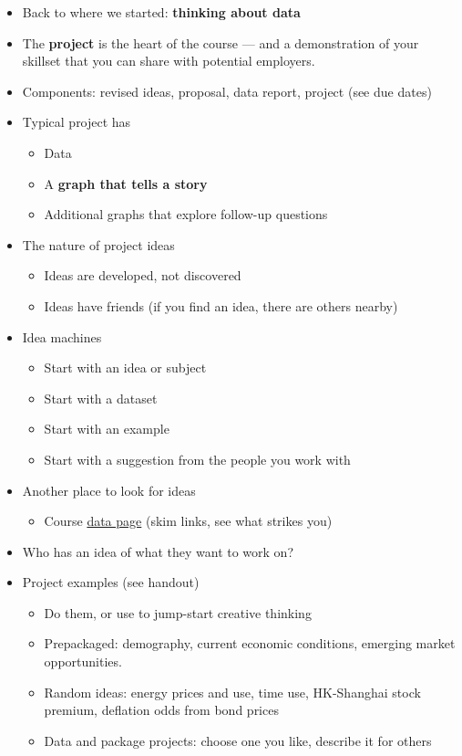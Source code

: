 \documentclass[11pt]{article}
\begin{document}
\begin{itemize}
\item Back to where we started:  {\bf thinking about data}

\item The {\bf project} is the heart of the course --- and a demonstration of your skillset
that you can share with potential employers.

\item Components:  revised ideas, proposal, data report, project (see due dates)

\item Typical project has
\begin{itemize}
\item Data
\item A {\bf graph that tells a story\/}
\item Additional graphs that explore follow-up questions
\end{itemize}


\item The nature of project ideas
\begin{itemize}
\item Ideas are developed, not discovered
\item Ideas have friends (if you find an idea, there are others nearby)
\end{itemize}


\item Idea machines
\begin{itemize}
\item Start with an idea or subject
\item Start with a dataset
\item Start with an example
\item Start with a suggestion from the people you work with
\end{itemize}


\item Another place to look for ideas
\begin{itemize}
\item Course
\href{http://databootcamp.nyuecon.com/bootcamp_data/}
{data page}
(skim links, see what strikes you)
\end{itemize}

\item Who has an idea of what they want to work on?

\item Project examples (see handout)
\begin{itemize}
\item Do them, or use to jump-start creative thinking
\item Prepackaged: demography, current economic conditions, emerging market opportunities.
\item Random ideas:  energy prices and use, time use, HK-Shanghai stock premium, 
deflation odds from bond prices
\item Data and package projects:  choose one you like, describe it for others 
\end{itemize}
\end{itemize}
\end{document}
